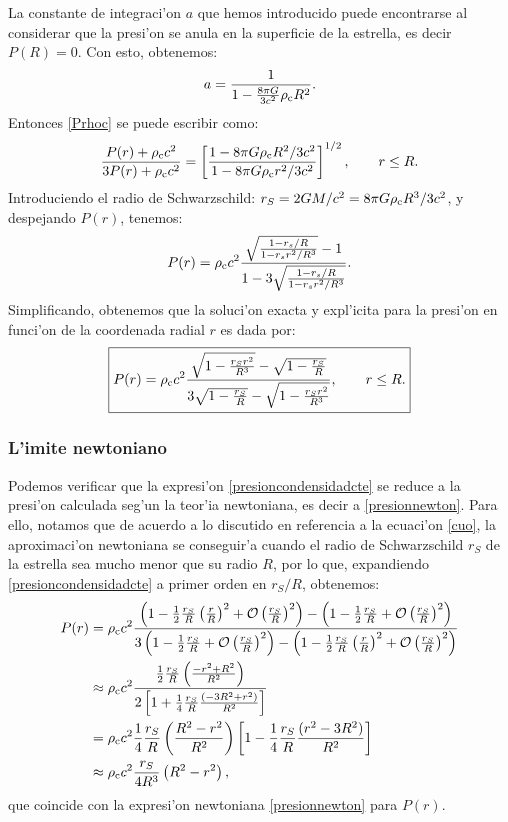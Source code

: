 La constante de integraci'on $a$ que hemos introducido puede encontrarse al considerar que la presi'on se anula en la superficie de la estrella, es decir $P(R)=0$. Con esto, obtenemos:
\begin{equation}
a=\frac{1}{1-\frac{8\pi G}{3 c^2}\rho_{\rm c} R^2}.
\end{equation}
Entonces \eqref{Prhoc} se puede escribir como:
\begin{equation}
\frac{P(r)+\rho_{\rm c}c^2}{3P(r)+\rho_{\rm c}c^2}=\left[\frac{1-8\pi G\rho_{\rm c}R^2/3c^2}{1-8\pi G\rho_{\rm c}r^2/3c^2} \right]^{1/2}, \qquad r\leq R.
\end{equation}
Introduciendo el radio de Schwarzschild: $r_S=2GM/c^2=8\pi G\rho_{\rm c}R^3/3c^2$, y despejando $P(r)$, tenemos:
\begin{gather}
P(r)=\rho_{\rm c} c^2\frac{\sqrt{\frac{1-r_s/R}{1-r_s r^2/R^3}}-1}{1-3\sqrt{\frac{1-r_s/R}{1-r_s r^2/R^3}}}.
\end{gather}
Simplificando, obtenemos que la soluci'on exacta y expl'icita para la presi'on en funci'on de la coordenada radial $r$ es dada por:
\begin{equation}\label{presioncondensidadcte}
\boxed{P(r)=\rho_{\rm c}c^2\frac{\sqrt{1-\frac{r_Sr^2}{R^3}}-\sqrt{1-\frac{r_S}{R}}}{ 3 \sqrt{1-\frac{r_S}{R}}-\sqrt{1-\frac{r_Sr^2}{R^3}}}, \qquad r\leq R.}
\end{equation}

\subsubsection{L'imite newtoniano}
Podemos verificar que la expresi'on \eqref{presioncondensidadcte} se reduce a la presi'on calculada seg'un la teor'ia newtoniana, es decir a \eqref{presionnewton}. Para ello, notamos que de acuerdo a lo discutido en referencia a la ecuaci'on \eqref{cuo}, la aproximaci'on newtoniana se conseguir'a cuando el radio de Schwarzschild $r_S$ de la estrella sea mucho menor que su radio $R$, por lo que, expandiendo \eqref{presioncondensidadcte} a primer orden en $r_S/R$, obtenemos:
\begin{align}
 P(r)&=\rho_{\rm c} c^2\frac{\left(1-\frac{1}{2}\frac{r_S}{R}\left(\frac{r}{R}\right)^2+\mathcal{O}\left(\frac{r_S}{R}\right)^2\right)-\left(1-\frac{1}{2}\frac{r_S}{R}+\mathcal{O}\left(\frac{r_S}{R}\right)^2\right)}{3\left(1-\frac{1}{2}\frac{r_S}{R}+\mathcal{O}\left(\frac{r_S}{R}\right)^2\right)-\left(1-\frac{1}{2}\frac{r_S}{R}\left(\frac{r}{R}\right)^2+\mathcal{O}\left(\frac{r_S}{R}\right)^2\right)}\\
&\approx\rho_{\rm c} c^2\frac{\frac{1}{2}\frac{r_S}{R}\left(\frac{-r^2+R^2}{R^2}\right)}{2\left[1+\frac{1}{4}\frac{r_S}{R}\frac{(-3R^2+r^2)}{R^2}\right]}\\
&=\rho_{\rm c} c^2\frac{1}{4}\frac{r_S}{R}\left(\frac{R^2-r^2}{R^2}\right)\left[1-\frac{1}{4}\frac{r_S}{R}\frac{(r^2-3R^2)}{R^2}\right]\\
&\approx\rho_{\rm c} c^2\frac{r_S}{4R^3}\left(R^2-r^2\right),
\end{align}
que coincide con la expresi'on newtoniana \eqref{presionnewton} para $P(r)$.

